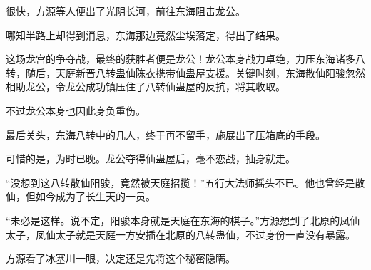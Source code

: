 \begin{this_body}
很快，方源等人便出了光阴长河，前往东海阻击龙公。

哪知半路上却得到消息，东海那边竟然尘埃落定，得出了结果。

这场龙宫的争夺战，最终的获胜者便是龙公！龙公本身战力卓绝，力压东海诸多八转，随后，天庭新晋八转蛊仙陈衣携带仙蛊屋支援。关键时刻，东海散仙阳骏忽然相助龙公，令龙公成功镇压住了八转仙蛊屋的反抗，将其收取。

不过龙公本身也因此身负重伤。

最后关头，东海八转中的几人，终于再不留手，施展出了压箱底的手段。

可惜的是，为时已晚。龙公夺得仙蛊屋后，毫不恋战，抽身就走。

“没想到这八转散仙阳骏，竟然被天庭招揽！”五行大法师摇头不已。他也曾经是散仙，但如今成为了长生天的一员。

“未必是这样。说不定，阳骏本身就是天庭在东海的棋子。”方源想到了北原的凤仙太子，凤仙太子就是天庭一方安插在北原的八转蛊仙，不过身份一直没有暴露。

方源看了冰塞川一眼，决定还是先将这个秘密隐瞒。

\end{this_body}

